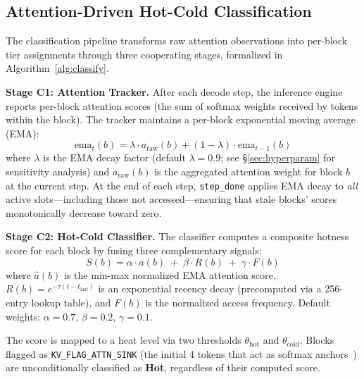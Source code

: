 \documentclass[conference]{IEEEtran}
\begin{document}
\subsection{Attention-Driven Hot-Cold Classification}
\label{sec:classification}

The classification pipeline transforms raw attention observations into per-block tier assignments through three cooperating stages, formalized in Algorithm~\ref{alg:classify}.

\textbf{Stage C1: Attention Tracker.} After each decode step, the inference engine reports per-block attention scores (the sum of softmax weights received by tokens within the block). The tracker maintains a per-block exponential moving average (EMA):
\begin{equation}
\text{ema}_{t}(b) = \lambda \cdot a_{\text{raw}}(b) + (1 - \lambda) \cdot \text{ema}_{t-1}(b)
\end{equation}
where $\lambda$ is the EMA decay factor (default $\lambda{=}0.9$; see \S\ref{sec:hyperparam} for sensitivity analysis) and $a_{\text{raw}}(b)$ is the aggregated attention weight for block $b$ at the current step. At the end of each step, \texttt{step\_done} applies EMA decay to \emph{all} active slots---including those not accessed---ensuring that stale blocks' scores monotonically decrease toward zero.

\textbf{Stage C2: Hot-Cold Classifier.} The classifier computes a composite hotness score for each block by fusing three complementary signals:
\begin{equation}
S(b) = \alpha \cdot \hat{a}(b) \;+\; \beta \cdot R(b) \;+\; \gamma \cdot F(b)
\label{eq:hotness}
\end{equation}
where $\hat{a}(b)$ is the min-max normalized EMA attention score, $R(b) = e^{-\tau (t - t_{\text{last}})}$ is an exponential recency decay (precomputed via a 256-entry lookup table), and $F(b)$ is the normalized access frequency. Default weights: $\alpha{=}0.7$, $\beta{=}0.2$, $\gamma{=}0.1$.

The score is mapped to a heat level via two thresholds $\theta_{\text{hot}}$ and $\theta_{\text{cold}}$. Blocks flagged as \texttt{KV\_FLAG\_ATTN\_SINK} (the initial 4 tokens that act as softmax anchors~\cite{streamingllm}) are unconditionally classified as \textbf{Hot}, regardless of their computed score.
\end{document}
